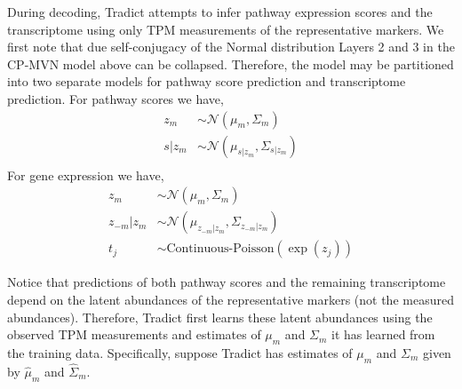 \documentclass[10pt]{article}
\begin{document}
During decoding, Tradict attempts to infer pathway expression scores and the transcriptome using only TPM measurements of the representative markers. We first note that due self-conjugacy of the Normal distribution Layers 2 and 3 in the CP-MVN model above can be collapsed. Therefore, the model may be partitioned into two separate models for pathway score prediction and transcriptome prediction. For pathway scores we have,
\begin{align*}
z_m & \sim \mathcal{N}(\mu_m, \Sigma_m) \\
s|z_m & \sim \mathcal{N}(\mu_{s|z_m}, \Sigma_{s|z_m}) \\
\end{align*}
For gene expression we have,
\begin{align*}
z_m & \sim \mathcal{N}(\mu_m, \Sigma_m) \\
z_{-m}|z_m & \sim \mathcal{N}(\mu_{z_{-m}|z_m}, \Sigma_{z_{-m}|z_m}) \\
t_j & \sim \textrm{Continuous-Poisson}(\exp(z_j))
\end{align*}

Notice that predictions of both pathway scores and the remaining transcriptome depend on the latent abundances of the representative markers (not the measured abundances). Therefore, Tradict first learns these latent abundances using the observed TPM measurements and estimates of $\mu_m$ and $\Sigma_m$ it has learned from the training data. Specifically, suppose Tradict has estimates of $\mu_m$ and $\Sigma_m$ given by $\hat{\mu}_m$ and $\hat{\Sigma}_m$.
\end{document}
